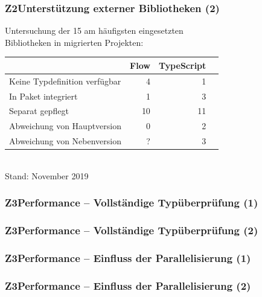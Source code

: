       \begin{frame}
        \frametitle{Z2\hspace{0.75em}Unterstützung externer Bibliotheken (2)}
        Untersuchung der 15 am häufigsten eingesetzten\\Bibliotheken in migrierten Projekten:\\[1em]
        {
          \footnotesize
          \begin{tabu} to 
            \midrule
            \rowfont{\bfseries} {} & Flow & TypeScript \\
            \midrule
            Keine Typdefinition verfügbar &  4 &  1 \\
            In Paket integriert           &  1 &  3 \\
            Separat gepflegt              & 10 & 11 \\
            \midrule
            Abweichung von Hauptversion   &  0 &  2 \\
            Abweichung von Nebenversion   &  ? &  3 \\
            \midrule
          \end{tabu}
          \\[.75em]
          Stand: November 2019
        }
      \end{frame}

      \begin{frame}
        \frametitle{Z3\hspace{0.75em}Performance -- Vollständige Typüberprüfung (1)}
        
      \end{frame}

      \begin{frame}
        \frametitle{Z3\hspace{0.75em}Performance -- Vollständige Typüberprüfung (2)}
        
      \end{frame}

      \begin{frame}
        \frametitle{Z3\hspace{0.75em}Performance -- Einfluss der Parallelisierung (1)}
        
      \end{frame}

      \begin{frame}
        \frametitle{Z3\hspace{0.75em}Performance -- Einfluss der Parallelisierung (2)}
        
      \end{frame}

